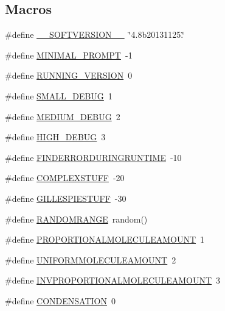 \subsection*{Macros}
\begin{DoxyCompactItemize}
\item 
\#define \hyperlink{a00050_aab38659c2fe462437b89a1e85e619dc7}{\+\_\+\+\_\+\+S\+O\+F\+T\+V\+E\+R\+S\+I\+O\+N\+\_\+\+\_\+}~\char`\"{}4.\+8b20131125.\char`\"{}
\item 
\#define \hyperlink{a00050_a972f6696f10f8159f336357f003493b6}{M\+I\+N\+I\+M\+A\+L\+\_\+\+P\+R\+O\+M\+P\+T}~-\/1
\item 
\#define \hyperlink{a00050_a72244054b9e2e45fe85cbef84bd42904}{R\+U\+N\+N\+I\+N\+G\+\_\+\+V\+E\+R\+S\+I\+O\+N}~0
\item 
\#define \hyperlink{a00050_a6f7711b8195edb3c3541c153ebcb4bfa}{S\+M\+A\+L\+L\+\_\+\+D\+E\+B\+U\+G}~1
\item 
\#define \hyperlink{a00050_ab0ead5a0a8c59ad5f4d9fcf0be28a5d7}{M\+E\+D\+I\+U\+M\+\_\+\+D\+E\+B\+U\+G}~2
\item 
\#define \hyperlink{a00050_ac2a71f467524d5299cbff5df96be638a}{H\+I\+G\+H\+\_\+\+D\+E\+B\+U\+G}~3
\item 
\#define \hyperlink{a00050_a0934dca9b46dc1ce8ccae606a6511f63}{F\+I\+N\+D\+E\+R\+R\+O\+R\+D\+U\+R\+I\+N\+G\+R\+U\+N\+T\+I\+M\+E}~-\/10
\item 
\#define \hyperlink{a00050_a186bfb39322832c790ce5403bc04330d}{C\+O\+M\+P\+L\+E\+X\+S\+T\+U\+F\+F}~-\/20
\item 
\#define \hyperlink{a00050_a27f5d30679c0e8877ba9246eb1a48ff4}{G\+I\+L\+L\+E\+S\+P\+I\+E\+S\+T\+U\+F\+F}~-\/30
\item 
\#define \hyperlink{a00050_a4cb4f6978b0d938a0523bd6946e7609d}{R\+A\+N\+D\+O\+M\+R\+A\+N\+G\+E}~random()
\item 
\#define \hyperlink{a00050_a79c4b6317fd327fd5a62d65036481a25}{P\+R\+O\+P\+O\+R\+T\+I\+O\+N\+A\+L\+M\+O\+L\+E\+C\+U\+L\+E\+A\+M\+O\+U\+N\+T}~1
\item 
\#define \hyperlink{a00050_a6236cb136896f6bcbc6694d394e8aca3}{U\+N\+I\+F\+O\+R\+M\+M\+O\+L\+E\+C\+U\+L\+E\+A\+M\+O\+U\+N\+T}~2
\item 
\#define \hyperlink{a00050_ae36555e0be87892071c6340cc0fa43ad}{I\+N\+V\+P\+R\+O\+P\+O\+R\+T\+I\+O\+N\+A\+L\+M\+O\+L\+E\+C\+U\+L\+E\+A\+M\+O\+U\+N\+T}~3
\item 
\#define \hyperlink{a00050_aeeaf3e004dff03f70f94e0cf7d623b3c}{C\+O\+N\+D\+E\+N\+S\+A\+T\+I\+O\+N}~0
\item 

\end{DoxyCompactItemize}
